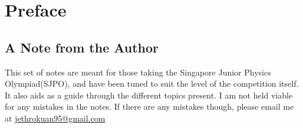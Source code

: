 \section*{Preface}
\subsection*{A Note from the Author}

This set of notes are meant for those taking the Singapore Junior
Physics Olympiad(SJPO), and have been tuned to suit the level of the
competition itself. It also aids as a guide through the different
topics present. I am not held viable for any mistakes in the notes. If
there are any mistakes though, please email me at
\href{mailto:jethrokuan95@gmail.com}{jethrokuan95@gmail.com
}
\newpage
